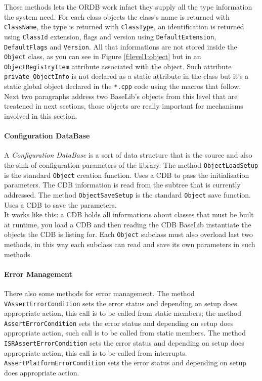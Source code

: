 Those methods lets the ORDB work infact they supply all the type information the system need. For each class objects the class's name is returned with \texttt{ClassName}, the type is returned with \texttt{ClassType}, an identification is returned using \texttt{ClassId} extension, flags and version using \texttt{DefaultExtension}, \texttt{DefaultFlags} and \texttt{Version}. All that informations are not stored inside the \texttt{Object} class, as you can see in Figure \ref{f:level1:object} but in an \texttt{ObjectRegistryItem} attribute associated with the object. Such attribute \texttt{private\_ObjectInfo} is not declared as a static attribute in the class but it's a static global object declared in the \texttt{*.cpp} code using the macros that follow.\\ 

Next two paragraphs address two BaseLib's objects from this level that are treatened in next sections, those objects are really important for mechanisms involved in this section.


\paragraph{Configuration DataBase}
A \textit{Configuration DataBase} is a sort of data structure that is the source and also the sink of configuration parameters of the library. The method \texttt{ObjectLoadSetup} is the standard \texttt{Object} creation function. Uses a CDB to pass the initialisation parameters. The CDB information is read from the subtree that is currently addressed. The method \texttt{ObjectSaveSetup} is the standard \texttt{Object} save function. Uses a CDB to save the parameters. \\


It works like this: a CDB holds all informations about classes that must be built at runtime, you load a CDB and then reading the CDB BaseLib instantiate the objects the CDB is listing for. Each \texttt{Object} subclass must also overload last two methods, in this way each subclass can read and save its own parameters in such methods.


\paragraph{Error Management}
There also some methods for error management. The method \texttt{VAssertErrorCondition} sets the error status and depending on setup does appropriate action, this call is to be called from static members; the method \texttt{AssertErrorCondition} sets the error status and depending on setup does appropriate action, such call is to be called from static members. The method \texttt{ISRAssertErrorCondition} sets the error status and depending on setup does appropriate action, this call is to be called from interrupts. \texttt{AssertPlatformErrorCondition} sets the error status and depending on setup does appropriate action.


